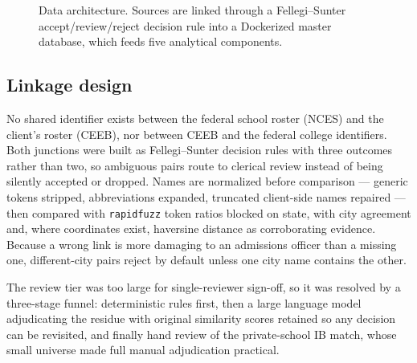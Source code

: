 \documentclass[12pt]{article}
\begin{document}
\begin{figure}[htbp]
{%
}
\caption{Data architecture. Sources are linked through a Fellegi--Sunter accept/review/reject decision rule into a Dockerized master database, which feeds five analytical components.}
\label{fig:pipeline}
\end{figure}

\subsection{Linkage design}

No shared identifier exists between the federal school roster (NCES) and the client's roster (CEEB), nor between CEEB and the federal college identifiers. Both junctions were built as Fellegi--Sunter decision rules with three outcomes rather than two, so ambiguous pairs route to clerical review instead of being silently accepted or dropped. Names are normalized before comparison --- generic tokens stripped, abbreviations expanded, truncated client-side names repaired --- then compared with \texttt{rapidfuzz} token ratios blocked on state, with city agreement and, where coordinates exist, haversine distance as corroborating evidence. Because a wrong link is more damaging to an admissions officer than a missing one, different-city pairs reject by default unless one city name contains the other.

The review tier was too large for single-reviewer sign-off, so it was resolved by a three-stage funnel: deterministic rules first, then a large language model \citep{anthropic_claude} adjudicating the residue with original similarity scores retained so any decision can be revisited, and finally hand review of the private-school IB match, whose small universe made full manual adjudication practical.
\end{document}
